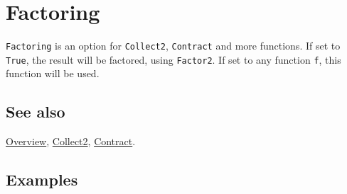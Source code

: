 \documentclass[../FeynCalcManual.tex]{subfiles}
\begin{document}
\hypertarget{factoring}{
\section{Factoring}\label{factoring}}

\texttt{Factoring} is an option for \texttt{Collect2}, \texttt{Contract}
and more functions. If set to \texttt{True}, the result will be
factored, using \texttt{Factor2}. If set to any function \texttt{f},
this function will be used.

\subsection{See also}

\hyperlink{toc}{Overview}, \hyperlink{collect2}{Collect2},
\hyperlink{contract}{Contract}.

\subsection{Examples}
\end{document}
